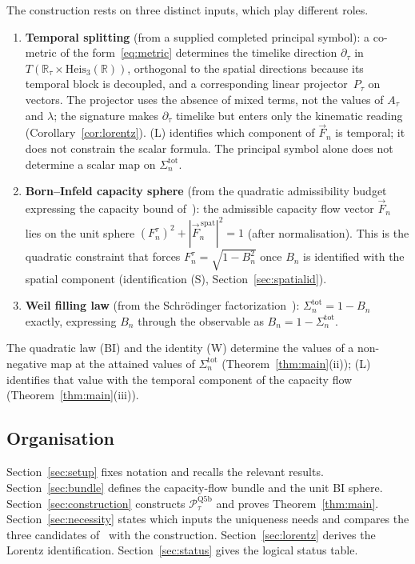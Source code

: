 \documentclass[11pt,a4paper]{article}
\begin{document}
      The construction rests on three distinct inputs, which play different roles.
      \begin{enumerate}
        \item[(L)] \textbf{Temporal splitting} (from a supplied completed principal symbol):
        a co-metric of the form~\eqref{eq:metric} determines the timelike direction
        $\partial_\tau$ in $T(\mathbb{R}_\tau \times \mathrm{Heis}_3(\mathbb{R}))$, orthogonal to the spatial
        directions because its temporal block is decoupled, and a corresponding linear projector~$P_\tau$ on
        vectors.
        The projector uses the absence of mixed terms, not the values of $A_\tau$ and $\lambda$; the signature
        makes $\partial_\tau$ timelike but enters only the kinematic reading (Corollary~\ref{cor:lorentz}).
        (L) identifies which component of $\vec{F}_n$ is temporal; it does not constrain the scalar formula.
        The principal symbol alone does not determine a scalar map on $\Sigma_n^{\mathrm{tot}}$.
        \item[(BI)] \textbf{Born--Infeld capacity sphere} (from the quadratic admissibility
        budget expressing the capacity bound of~\cite{Beau2026c}): the admissible capacity flow vector
        $\vec{F}_n$ lies on the unit sphere $(F_n^\tau)^2 + |\vec{F}_n^{\,\mathrm{spat}}|^2 = 1$ (after normalisation).
        This is the quadratic constraint that forces $F_n^\tau = \sqrt{1 - B_n^2}$ once $B_n$
        is identified with the spatial component (identification (S), Section~\ref{sec:spatialid}).
        \item[(W)] \textbf{Weil filling law} (from the Schr\"odinger factorization~\cite{Beau2026n}):
        $\Sigma_n^{\mathrm{tot}} = 1 - B_n$ exactly, expressing $B_n$ through the observable as
        $B_n = 1 - \Sigma_n^{\mathrm{tot}}$.
      \end{enumerate}
      The quadratic law (BI) and the identity (W) determine the values of a non-negative map at the attained
      values of $\Sigma_n^{\mathrm{tot}}$ (Theorem~\ref{thm:main}(ii)); (L) identifies that value with the temporal
      component of the capacity flow (Theorem~\ref{thm:main}(iii)).

    \subsection{Organisation}

      Section~\ref{sec:setup} fixes notation and recalls the relevant results.
      Section~\ref{sec:bundle} defines the capacity-flow bundle and the unit BI sphere.
      Section~\ref{sec:construction} constructs $\mathcal{P}_\tau^{\mathrm{Q5b}}$ and proves
      Theorem~\ref{thm:main}.
      Section~\ref{sec:necessity} states which inputs the uniqueness needs and compares the
      three candidates of~\cite{Beau2026n} with the construction.
      Section~\ref{sec:lorentz} derives the Lorentz identification.
      Section~\ref{sec:status} gives the logical status table.
\end{document}
